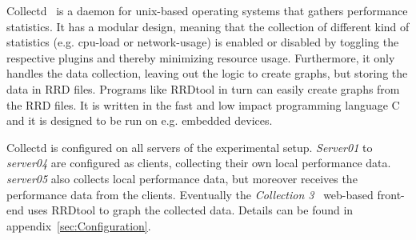 Collectd~\cite{collectd2013} is a daemon for unix-based operating systems that gathers performance statistics. It has a modular design, meaning that the collection of different kind of statistics (e.g. cpu-load or network-usage) is enabled or disabled by toggling the respective plugins and thereby minimizing resource usage. Furthermore, it only handles the data collection, leaving out the logic to create graphs, but storing the data in \ac{RRD} files. Programs like RRDtool in turn can easily create graphs from the RRD files. It is written in the fast and low impact programming language C~\cite{prechelt2000empirical} and it is designed to be run on e.g. embedded devices.

Collectd is configured on all servers of the experimental setup. \emph{Server01} to \emph{server04} are configured as clients, collecting their own local performance data. \emph{server05} also collects local performance data, but moreover receives the performance data from the clients. Eventually the \emph{Collection 3}~\cite{collection3} web-based front-end uses RRDtool to graph the collected data. Details can be found in appendix~\ref{sec:Configuration}.
